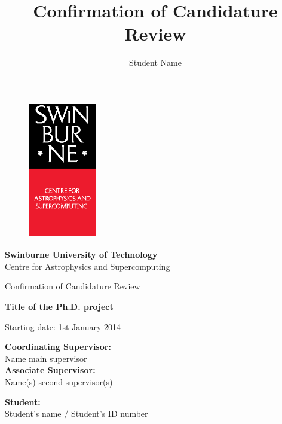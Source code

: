 \documentclass[useAMS,usenatbib,onecolumn]{mnras}
\title{Confirmation of Candidature Review}
\author[Student Name]
 {Student Name}
\begin{document}
\fontsize{11}{12.5}\selectfont
\begin{center}

\begin{figure}
\begin{center}
\includegraphics[height=6cm,width=3cm]{./astro_v.eps}
\end{center}
\end{figure}

{\bf \LARGE S\Large winburne \LARGE U\Large niversity of  \LARGE T\Large echnology\\
\vspace{0.5cm}}
\LARGE C\Large entre for \LARGE A\Large strophysics and \LARGE S\Large upercomputing\\
\vspace{0.5cm}

\large Confirmation of Candidature Review\\
\vspace{0.5cm}



\Huge{\bf Title of the Ph.D. project}

\vspace{3cm}
\large{Starting date: 1st January 2014}
\end{center}


\begin{flushleft}
{\bf Coordinating Supervisor:}\\
Name main supervisor\\
\vspace{0.5cm}
{\bf Associate Supervisor:}\\
Name(s) second supervisor(s)\\
\end{flushleft}

\begin{flushright}
{\bf Student:}\\
Student's name / Student's ID number
\end{flushright}\hspace{8cm}
\end{document}
